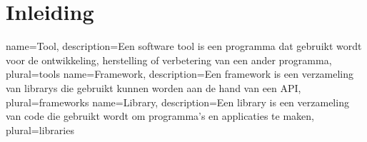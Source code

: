 
\chapter{Inleiding}
\label{ch:inleiding}


{
    name=Tool,
    description={Een software tool is een programma dat gebruikt wordt voor de ontwikkeling, herstelling of verbetering van een ander programma, \textcite{Tool2004}}
    plural={tools}
}
{
    name=Framework,
    description={Een framework is een verzameling van \glspl{library} die gebruikt kunnen worden aan de hand van een \gls{API}, \textcite{Framework}}
    plural={frameworks}
}
{
    name=Library,
    description={Een library is een verzameling van code die gebruikt wordt om programma's en applicaties te maken, \textcite{Library}}
    plural={libraries}
}


